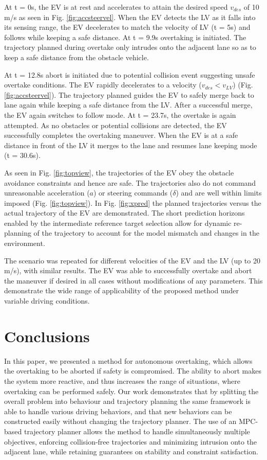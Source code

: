 \documentclass[letterpaper, 10 pt, conference]{ieeeconf}
\begin{document}
At t = 0s, the EV is at rest and accelerates to attain the desired speed $v_{des}$ of 10 m/s as seen in Fig. \ref{fig:accsteervel}. When the EV detects the LV as it falls into its sensing range, the EV decelerates to match the velocity of LV (t = 5s) and follows while keeping a safe distance. At t = 9.9s overtaking is initiated. The trajectory planned during overtake only intrudes onto the adjacent lane so as to keep a safe distance from the obstacle vehicle.\

At t = 12.8s abort is initiated due to potential collision event suggesting unsafe overtake conditions. The EV rapidly decelerates to a velocity ($v_{des} < v_{LV}$) (Fig. \ref{fig:accsteervel}). The trajectory planned guides the EV to safely merge back to lane again while keeping a safe distance from the LV. After a successful merge, the EV again switches to follow mode. At t = 23.7s, the overtake is again attempted. As no obstacles or potential collisions are detected, the EV successfully completes the overtaking maneuver. When the EV is at a safe distance in front of the LV it merges to the lane and resumes lane keeping mode (t = 30.6s).\

As seen in Fig. \ref{fig:topview}, the trajectories of the EV obey the obstacle avoidance constraints and hence are safe. The trajectories also do not command unreasonable acceleration ($a$) or steering commands ($\delta$) and are well within limits imposed (Fig. \ref{fig:topview}). In Fig. \ref{fig:xpred} the planned trajectories versus the actual trajectory of the EV are demonstrated. The short prediction horizons enabled by the intermediate reference target selection allow for dynamic re-planning of the trajectory to account for the model mismatch and changes in the environment.

The scenario was repeated for different velocities of the EV and the LV (up to 20 m/s), with similar results. The EV was able to successfully overtake and abort the maneuver if desired in all cases without modifications of any parameters. This demonstrate the wide range of applicability of the proposed method under variable driving conditions.

\section{Conclusions}

In this paper, we presented a method for autonomous overtaking, which allows the overtaking to be aborted if safety is compromised. 
The ability to abort makes the system more reactive, and thus increases the range of situations, where overtaking can be performed safely.
Our work demonstrates that by splitting the overall problem into behaviour and trajectory planning the same framework is able to handle various driving behaviors, and that new behaviors can be constructed easily without changing the trajectory planner.
The use of an MPC-based trajectory planner allows the method to handle simultaneously multiple objectives, enforcing collision-free trajectories and minimizing intrusion onto the adjacent lane, while retaining guarantees on stability and constraint satisfaction.  
\end{document}
